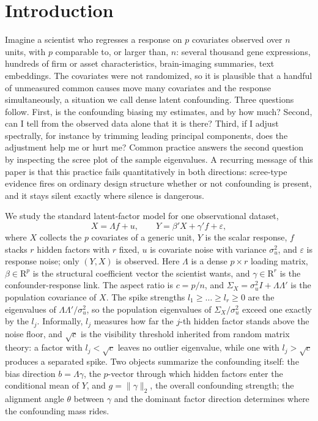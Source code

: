 \section{Introduction}\label{sec:intro}

Imagine a scientist who regresses a response on $p$ covariates observed over $n$ units, with $p$ comparable to, or larger than, $n$: several thousand gene expressions, hundreds of firm or asset characteristics, brain-imaging summaries, text embeddings. The covariates were not randomized, so it is plausible that a handful of unmeasured common causes move many covariates and the response simultaneously, a situation we call dense latent confounding. Three questions follow. First, is the confounding biasing my estimates, and by how much? Second, can I tell from the observed data alone that it is there? Third, if I adjust spectrally, for instance by trimming leading principal components, does the adjustment help me or hurt me? Common practice answers the second question by inspecting the scree plot of the sample eigenvalues. A recurring message of this paper is that this practice fails quantitatively in both directions: scree-type evidence fires on ordinary design structure whether or not confounding is present, and it stays silent exactly where silence is dangerous.

We study the standard latent-factor model for one observational dataset,
\[
X = \Lambda f + u, \qquad Y = \beta' X + \gamma' f + \varepsilon ,
\]
where $X$ collects the $p$ covariates of a generic unit, $Y$ is the scalar response, $f$ stacks $r$ hidden factors with $r$ fixed, $u$ is covariate noise with variance $\sigma_u^2$, and $\varepsilon$ is response noise; only $(Y,X)$ is observed. Here $\Lambda$ is a dense $p \times r$ loading matrix, $\beta \in \mathrm{R}^p$ is the structural coefficient vector the scientist wants, and $\gamma \in \mathrm{R}^r$ is the confounder-response link. The aspect ratio is $c = p/n$, and $\Sigma_X = \sigma_u^2 I + \Lambda\Lambda'$ is the population covariance of $X$. The spike strengths $l_1 \ge \dots \ge l_r \ge 0$ are the eigenvalues of $\Lambda\Lambda'/\sigma_u^2$, so the population eigenvalues of $\Sigma_X/\sigma_u^2$ exceed one exactly by the $l_j$. Informally, $l_j$ measures how far the $j$-th hidden factor stands above the noise floor, and $\sqrt{c}$ is the visibility threshold inherited from random matrix theory: a factor with $l_j < \sqrt{c}$ leaves no outlier eigenvalue, while one with $l_j > \sqrt{c}$ produces a separated spike. Two objects summarize the confounding itself: the bias direction $b = \Lambda\gamma$, the $p$-vector through which hidden factors enter the conditional mean of $Y$, and $g = \|\gamma\|_2$, the overall confounding strength; the alignment angle $\theta$ between $\gamma$ and the dominant factor direction determines where the confounding mass rides.

